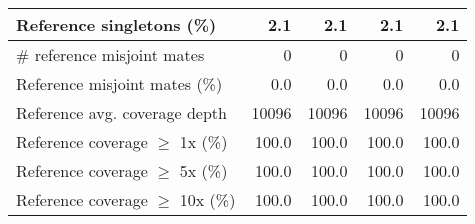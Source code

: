 \documentclass[12pt,a4paper]{article}
\begin{document}
\begin{table}[ht]
\begin{center}
\begin{tabular}{|l*{4}{|r}|}
Reference singletons (\%) & 2.1 & 2.1 & 2.1 & 2.1 \\ \hline
\# reference misjoint mates & 0 & 0 & 0 & 0 \\ \hline
Reference misjoint mates (\%) & 0.0 & 0.0 & 0.0 & 0.0 \\ \hline
Reference avg. coverage depth & 10096 & 10096 & 10096 & 10096 \\ \hline
Reference coverage $\geq$ 1x (\%) & 100.0 & 100.0 & 100.0 & 100.0 \\ \hline
Reference coverage $\geq$ 5x (\%) & 100.0 & 100.0 & 100.0 & 100.0 \\ \hline
Reference coverage $\geq$ 10x (\%) & 100.0 & 100.0 & 100.0 & 100.0 \\ \hline
\end{tabular}
\end{center}
\end{table}
\end{document}
